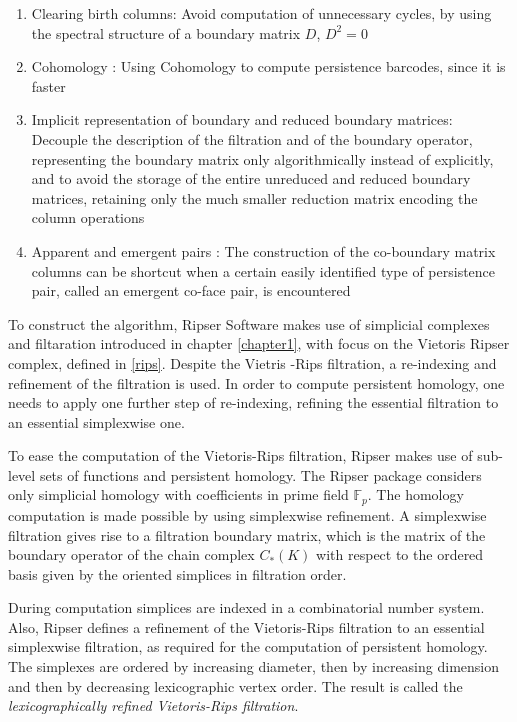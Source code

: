 \documentclass[11pt,a4paper]{report}
\begin{document}
            \begin{enumerate}
             \item Clearing birth columns:
             Avoid computation of unnecessary cycles, by using the spectral structure of a boundary matrix $D$, $D^2 = 0$
             \item Cohomology :
             Using Cohomology to compute persistence barcodes, since it is faster
             \item Implicit representation of boundary and reduced boundary matrices:
              Decouple the description of the filtration and of the boundary operator, representing the boundary matrix only algorithmically
                instead of explicitly, and to avoid the storage of the entire unreduced and reduced boundary matrices, retaining
                only the much smaller reduction matrix encoding the column operations
            \item Apparent and emergent pairs :
            The construction of the co-boundary matrix columns can be shortcut when a
            certain easily identified type of persistence pair, called an emergent co-face pair, is encountered
            \end{enumerate}

            To construct the algorithm, Ripser Software makes use of simplicial complexes and filtaration introduced in chapter \ref{chapter1}, with focus on the Vietoris Ripser complex, defined in \ref{rips}. Despite the Vietris -Rips filtration, a re-indexing and refinement of the filtration is used. In order to compute persistent homology, one needs to apply one further step of
            re-indexing, refining the essential filtration to an essential simplexwise one.

            To ease the computation of the Vietoris-Rips filtration, Ripser makes use of sub-level sets of functions and persistent homology. The Ripser package considers only simplicial homology with
            coefficients in prime field $\mathbb{F}_p$. The homology computation is made possible by using simplexwise refinement. A simplexwise filtration gives rise to a filtration boundary matrix,
            which is the matrix of the boundary operator of the chain complex $C_*(K)$ with respect to the ordered basis given by the oriented simplices in filtration order.

            During computation simplices are indexed in a combinatorial number system. Also, Ripser defines a refinement of the Vietoris-Rips filtration to an essential simplexwise filtration, as required for the computation of persistent homology. The simplexes are ordered by increasing diameter, then by increasing dimension and then by decreasing lexicographic vertex order. The result is called the
            \emph{lexicographically refined Vietoris-Rips filtration}.
\end{document}

